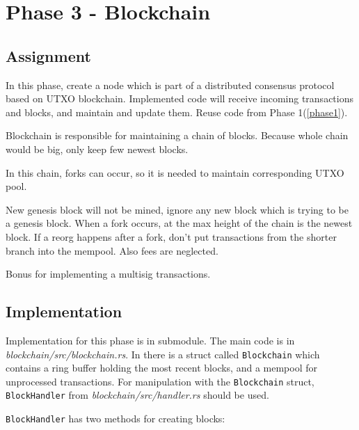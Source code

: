 \section{Phase 3 - Blockchain}

\subsection{Assignment}

In this phase, create a node which is part of a distributed consensus protocol
based on UTXO blockchain. Implemented code will receive incoming transactions and
blocks, and maintain and update them. Reuse code from Phase 1(\ref{phase1}).

Blockchain is responsible for maintaining a chain of blocks. Because whole
chain would be big, only keep few newest blocks.

In this chain, forks can occur, so it is needed to maintain corresponding
UTXO pool.

New genesis block will not be mined, ignore any new block which is trying to be
a genesis block. When a fork occurs, at the max height of the chain is the newest
block. If a reorg happens after a fork, don't put transactions from the shorter
branch into the mempool. Also fees are neglected.

Bonus for implementing a multisig transactions.

\subsection{Implementation}

Implementation for this phase is in submodule. The main
code is in \emph{blockchain/src/blockchain.rs}. In there is a struct called
\texttt{Blockchain} which contains a ring buffer holding the most recent
blocks, and a mempool for unprocessed transactions. For manipulation with
the \texttt{Blockchain} struct, \texttt{BlockHandler} from \emph{blockchain/src/handler.rs}
should be used.

\pagebreak
\texttt{BlockHandler} has two methods for creating blocks:

